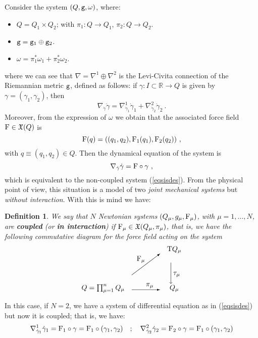 \documentclass[12pt]{report}
\newtheorem{definition}[teor]{Definition}
\def\bit{\begin{itemize}}
\def\eit{\end{itemize}}
\def\vf{\mathfrak X}
\def\Real{\mathbb{R}}
\def\Tan{{\rm T}}
\begin{document}
Consider the system $(Q,{\tt g},\omega)$, where:
\bit
\item
$Q=Q_1\times Q_2$; with $\pi_1\colon Q\to Q_1$, $\pi_2\colon Q\to Q_2$.
\item
${\tt g}={\tt g}_1\oplus{\tt g}_2$.
\item
$\omega=\pi_1^*\omega_1+\pi^*_2\omega_2$.
\eit
where we can see that $\nabla=\nabla^1\oplus\nabla^2$ 
is the Levi-Civita connection of the Riemannian metric ${\tt g}$, defined as follows:
 if $\gamma\colon I\subset\Real\to Q$
is given by $\gamma=(\gamma_1,\gamma_2)$, then
$$
\nabla_{\dot\gamma}\dot\gamma=
\nabla^1_{\dot\gamma_1}\dot\gamma_1+\nabla^2_{\dot\gamma_2}\dot\gamma_2 \ .
$$
Moreover, from the expression of $\omega$ we obtain that the associated force field ${\rm F}\in\vf (Q)$ is
$$
{\rm F}(q)=((q_1,q_2),{\rm F}_1(q_1),{\rm F}_2(q_2)) \ ,
$$
with $q\equiv (q_1,q_2)\in Q$.
Then the dynamical equation of the system is
$$
\nabla_{\dot\gamma}\dot\gamma={\rm F}\circ\gamma \	 ,
$$
which is equivalent to the non-coupled system (\ref{eqsisdes}).
From the physical point of view, this situation is a model of two
{\sl joint mechanical systems} but {\sl without interaction}.
With this is mind we have:

\begin{definition}
We say that $N$ Newtonian systems $(Q_\mu,g_\mu,{\rm F}_\mu)$, with
$\mu=1,\ldots ,N$, are \textbf{coupled} (or \textbf{in interaction}) if
${\rm F}_\mu\in\vf (Q_\mu,\pi_\mu)$, that is,
we have the following commutative diagram for the force field acting on the system
$$
\begin{array}{ccc}
& &\Tan Q_\mu \\
&
\begin{picture}(40,30)(0,0)
\put(7,20){\mbox{${\rm F}_\mu$}}
\put(0,0){\vector(4,3){40}}
\end{picture}
&
\Bigg\downarrow \tau_\mu
\\
Q=\prod_{\mu=1}^n Q_\mu
&
\begin{picture}(40,5)(0,0)
\put(20,5){\mbox{$\pi_\mu$}}
\put(0,0){\vector(1,0){40}}
\end{picture}
& Q_\mu
\end{array}
$$
\end{definition}

In this case, if $N=2$, we have a system of differential equation as in (\ref{eqsisdes}) but now it is coupled; that is, we have:
$$
\nabla^1_{\dot\gamma_1}\dot\gamma_1={\rm F}_1\circ\gamma={\rm F}_1\circ(\gamma_1,\gamma_2)
\quad ; \quad
\nabla^2_{\dot\gamma_2}\dot\gamma_2={\rm F}_2\circ\gamma={\rm F}_1\circ(\gamma_1,\gamma_2)
$$
\end{document}
